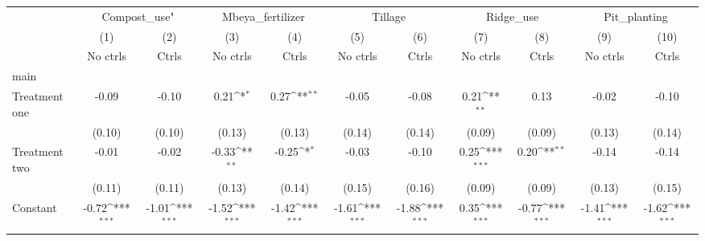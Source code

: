 {
\def\sym#1{\ifmmode^{#1}\else\(^{#1}\)\fi}
\begin{tabular}{l*{10}{c}}
\hline\hline
                    &\multicolumn{2}{c}{Compost\_use"}           &\multicolumn{2}{c}{Mbeya\_fertilizer}       &\multicolumn{2}{c}{Tillage}                &\multicolumn{2}{c}{Ridge\_use}              &\multicolumn{2}{c}{Pit\_planting}           \\
                    &\multicolumn{1}{c}{(1)}&\multicolumn{1}{c}{(2)}&\multicolumn{1}{c}{(3)}&\multicolumn{1}{c}{(4)}&\multicolumn{1}{c}{(5)}&\multicolumn{1}{c}{(6)}&\multicolumn{1}{c}{(7)}&\multicolumn{1}{c}{(8)}&\multicolumn{1}{c}{(9)}&\multicolumn{1}{c}{(10)}\\
                    &\multicolumn{1}{c}{No ctrls}&\multicolumn{1}{c}{Ctrls}&\multicolumn{1}{c}{No ctrls}&\multicolumn{1}{c}{Ctrls}&\multicolumn{1}{c}{No ctrls}&\multicolumn{1}{c}{Ctrls}&\multicolumn{1}{c}{No ctrls}&\multicolumn{1}{c}{Ctrls}&\multicolumn{1}{c}{No ctrls}&\multicolumn{1}{c}{Ctrls}\\
\hline
main                &                     &                     &                     &                     &                     &                     &                     &                     &                     &                     \\
Treatment one       &       -0.09         &       -0.10         &        0.21\sym{*}  &        0.27\sym{**} &       -0.05         &       -0.08         &        0.21\sym{**} &        0.13         &       -0.02         &       -0.10         \\
                    &      (0.10)         &      (0.10)         &      (0.13)         &      (0.13)         &      (0.14)         &      (0.14)         &      (0.09)         &      (0.09)         &      (0.13)         &      (0.14)         \\
[1em]
Treatment two       &       -0.01         &       -0.02         &       -0.33\sym{**} &       -0.25\sym{*}  &       -0.03         &       -0.10         &        0.25\sym{***}&        0.20\sym{**} &       -0.14         &       -0.14         \\
                    &      (0.11)         &      (0.11)         &      (0.13)         &      (0.14)         &      (0.15)         &      (0.16)         &      (0.09)         &      (0.09)         &      (0.13)         &      (0.15)         \\
[1em]
Constant            &       -0.72\sym{***}&       -1.01\sym{***}&       -1.52\sym{***}&       -1.42\sym{***}&       -1.61\sym{***}&       -1.88\sym{***}&        0.35\sym{***}&       -0.77\sym{***}&       -1.41\sym{***}&       -1.62\sym{***}\\

\end{tabular}}
